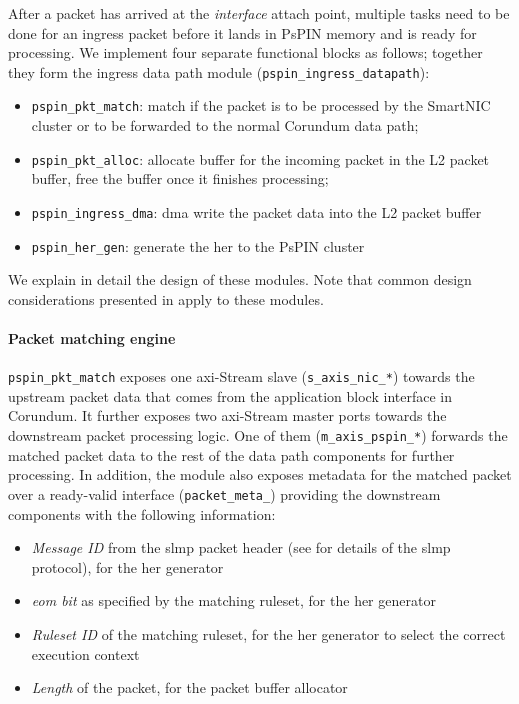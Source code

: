 After a packet has arrived at the \emph{interface} attach point, multiple tasks need to be done for an ingress packet before it lands in PsPIN memory and is ready for processing.  We implement four separate functional blocks as follows; together they form the ingress data path module (\texttt{pspin\_\-ingress\_\-datapath}):

\begin{itemize}
    \item \texttt{pspin\_\-pkt\_\-match}: match if the packet is to be processed by the SmartNIC cluster or to be forwarded to the normal Corundum data path;
    \item \texttt{pspin\_\-pkt\_\-alloc}: allocate buffer for the incoming packet in the L2 packet buffer, free the buffer once it finishes processing;
    \item \texttt{pspin\_\-ingress\_\-dma}: \ac{dma} write the packet data into the L2 packet buffer
    \item \texttt{pspin\_\-her\_\-gen}: generate the \ac{her} to the PsPIN cluster
\end{itemize}

We explain in detail the design of these modules.  Note that common design considerations presented in  apply to these modules.

\paragraph{Packet matching engine} \texttt{pspin\_\-pkt\_\-match} exposes one \ac{axi}-Stream slave (\texttt{s\_\-axis\_\-nic\_\-*}) towards the upstream packet data that comes from the application block interface in Corundum.  It further exposes two \ac{axi}-Stream master ports towards the downstream packet processing logic.  One of them (\texttt{m\_\-axis\_\-pspin\_\-*}) forwards the matched packet data to the rest of the data path components for further processing.  In addition, the module also exposes metadata for the matched packet over a ready-valid interface (\texttt{packet\_\-meta\_\-}) providing the downstream components with the following information:

\begin{itemize}
    \item \emph{Message ID} from the \ac{slmp} packet header (see  for details of the \ac{slmp} protocol), for the \ac{her} generator
    \item \emph{\ac{eom} bit} as specified by the matching ruleset, for the \ac{her} generator
    \item \emph{Ruleset ID} of the matching ruleset, for the \ac{her} generator to select the correct execution context
    \item \emph{Length} of the packet, for the packet buffer allocator
\end{itemize}


